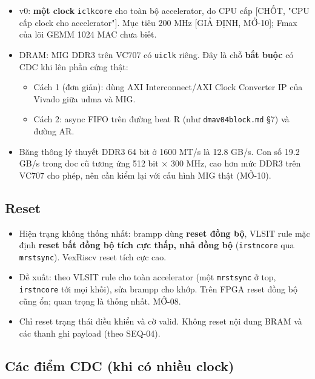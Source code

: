 \documentclass[11pt,a4paper]{article}
\renewcommand{\_}{\oldus\allowbreak}
\providecommand{\tightlist}{\setlength{\itemsep}{0pt}\setlength{\parskip}{0pt}}
\begin{document}
\begin{itemize}
\tightlist
\item
  v0: \textbf{một clock} \texttt{i\_clk\_core} cho toàn bộ accelerator,
  do CPU cấp {[}CHỐT, "CPU cấp clock cho accelerator"{]}. Mục tiêu 200
  MHz {[}GIẢ ĐỊNH, MỞ-10{]}; Fmax của lõi GEMM 1024 MAC chưa biết.
\item
  DRAM: MIG DDR3 trên VC707 có \texttt{ui\_clk} riêng. Đây là chỗ
  \textbf{bắt buộc} có CDC khi lên phần cứng thật:

  \begin{itemize}
  \tightlist
  \item
    Cách 1 (đơn giản): dùng AXI Interconnect/AXI Clock Converter IP của
    Vivado giữa u\_dma và MIG.
  \item
    Cách 2: async FIFO trên đường beat R (như
    \texttt{dma\_v0\_4block.md} §7) và đường AR.
  \end{itemize}
\item
  Băng thông lý thuyết DDR3 64 bit ở 1600 MT/s là 12.8 GB/s. Con số 19.2
  GB/s trong doc cũ tương ứng 512 bit × 300 MHz, cao hơn mức DDR3 trên
  VC707 cho phép, nên cần kiểm lại với cấu hình MIG thật (MỞ-10).
\end{itemize}

\subsection{Reset}

\begin{itemize}
\tightlist
\item
  Hiện trạng không thống nhất: bram\_pp dùng \textbf{reset đồng bộ},
  VLSIT rule mặc định \textbf{reset bất đồng bộ tích cực thấp, nhả đồng
  bộ} (\texttt{i\_rst\_n\_core} qua \texttt{m\_rst\_sync}). VexRiscv
  reset tích cực cao.
\item
  Đề xuất: theo VLSIT rule cho toàn accelerator (một
  \texttt{m\_rst\_sync} ở top, \texttt{i\_rst\_n\_core} tới mọi khối),
  sửa bram\_pp cho khớp. Trên FPGA reset đồng bộ cũng ổn; quan trọng là
  thống nhất. MỞ-08.
\item
  Chỉ reset trạng thái điều khiển và cờ valid. Không reset nội dung BRAM
  và các thanh ghi payload (theo SEQ-04).
\end{itemize}

\subsection{Các điểm CDC (khi có nhiều clock)}
\end{document}
